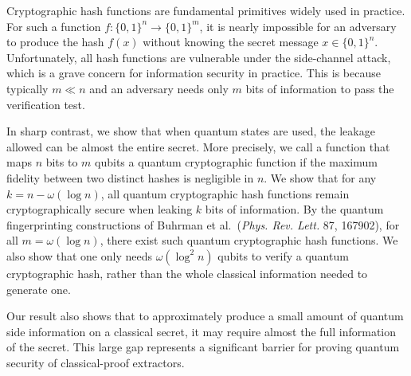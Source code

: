 \noindent
Cryptographic hash functions are fundamental primitives widely used in practice.
For such a function $f:\{0, 1\}^n\to\{0, 1\}^m$,
it is nearly impossible for an adversary to produce the hash $f(x)$ without knowing the secret message 
$x\in\{0, 1\}^n$. Unfortunately, all hash functions are vulnerable under the side-channel attack, which is a
grave concern for information security in practice. This is because typically $m\ll n$ and an adversary needs only $m$ bits of information to pass the verification test.

In sharp contrast, we show that when quantum states are used, the leakage allowed can be almost the entire secret.  More precisely, we call a function that maps $n$ bits to $m$ qubits a quantum cryptographic function
if the maximum fidelity between two distinct hashes is negligible in $n$.
We show that for any $k=n-\omega(\log n)$, all quantum cryptographic hash functions remain 
cryptographically secure when leaking $k$ bits of information.
By the quantum fingerprinting constructions of Buhrman et al.~({\em Phys. Rev. Lett.} 87, 167902), 
for all $m=\omega(\log n)$, there exist such quantum cryptographic hash functions. We also show that one only needs $\omega(\log^2 n)$ qubits to verify a quantum cryptographic hash, rather than the whole classical information needed to generate one.

Our result also shows that to approximately produce a small amount of quantum side information on a classical secret, it may require almost the full information of the secret. 
This large gap represents a significant barrier for proving quantum security of classical-proof extractors.

